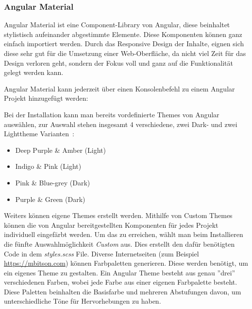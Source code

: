 \cite{rendering-engine-ivy, incremental-dom}

\cleardoublepage

\subsubsection{Angular Material}
Angular Material ist eine Component-Library von Angular, diese beinhaltet stylistisch aufeinander abgestimmte Elemente.
Diese Komponenten können ganz einfach importiert werden. Durch das Responsive Design der Inhalte, eignen sich diese sehr gut
für die Umsetzung einer Web-Oberfläche, da nicht viel Zeit für das Design verloren geht, sondern der Fokus voll und ganz
auf die Funktionalität gelegt werden kann.

Angular Material kann jederzeit über einen Konsolenbefehl zu einem Angular Projekt hinzugefügt werden:
\begin{center}
\end{center}

Bei der Installation kann man bereits vordefinierte Themes von Angular auswählen, zur Auswahl stehen insgesamt 4 verschiedene,
zwei Dark- und zwei Lighttheme Varianten~\cite{angular-material-predefined-themes}:

\begin{itemize}
    \item Deep Purple \& Amber (Light)
    \item Indigo \& Pink (Light)
    \item Pink \& Blue-grey (Dark)
    \item Purple \& Green (Dark)
\end{itemize}

Weiters können eigene Themes erstellt werden.
Mithilfe von Custom Themes können die von Angular bereitgestellten Komponenten für jedes Projekt individuell eingefärbt werden.
Um das zu erreichen, wählt man beim Installieren die fünfte Auswahlmöglichkeit \emph{Custom} aus.
Dies erstellt den dafür benötigten Code in dem \emph{styles.scss} File.
Diverse Internetseiten (zum Beispiel \href{https://mcg.mbitson.com/#!?primary=%2300b27a&themename=webmap-theme}{https://mbitson.com})
können Farbpaletten generieren.
Diese werden benötigt, um ein eigenes Theme zu gestalten.
Ein Angular Theme besteht aus genau ''drei'' verschiedenen Farben, wobei jede Farbe aus einer eigenen Farbpalette besteht.
Diese Paletten beinhalten die Basisfarbe und mehreren Abstufungen davon, um unterschiedliche Töne für Hervorhebungen zu haben.


